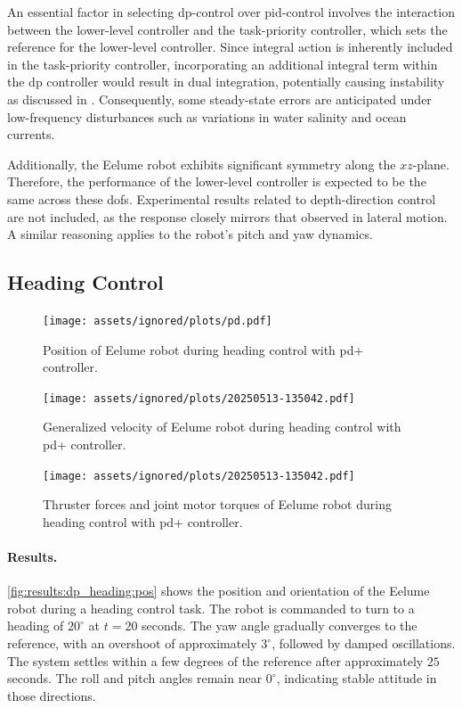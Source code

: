 An essential factor in selecting \gls{dp}-control over \gls{pid}-control involves the interaction between the lower-level controller and the task-priority controller, which sets the reference for the lower-level controller. Since integral action is inherently included in the task-priority controller, incorporating an additional integral term within the \gls{dp} controller would result in dual integration, potentially causing instability as discussed in \cite{fossen}. Consequently, some steady-state errors are anticipated under low-frequency disturbances such as variations in water salinity and ocean currents.

Additionally, the Eelume robot exhibits significant symmetry along the $xz$-plane. Therefore, the performance of the lower-level controller is expected to be the same across these \glspl{dof}. Experimental results related to depth-direction control are not included, as the response closely mirrors that observed in lateral motion. A similar reasoning applies to the robot’s pitch and yaw dynamics.

\subsection{Heading Control}

\begin{figure}[!ht]
    \centering
    \texttt{[image: assets/ignored/plots/pd.pdf]}
    \caption{Position of Eelume robot during heading control with \gls{pd+} controller.}
    \label{fig:results:dp_heading:pos}
\end{figure}
\begin{figure}[!ht]
    \centering
    \texttt{[image: assets/ignored/plots/20250513-135042.pdf]}
    \caption{Generalized velocity of Eelume robot during heading control with \gls{pd+} controller.}
    \label{fig:results:dp_heading:vel}
\end{figure}
\begin{figure}[!ht]
    \centering
    \texttt{[image: assets/ignored/plots/20250513-135042.pdf]}
    \caption{Thruster forces and joint motor torques of Eelume robot during heading control with \gls{pd+} controller.}
    \label{fig:results:dp_heading:forces2}
\end{figure}

\paragraph{Results.}
\autoref{fig:results:dp_heading:pos} shows the position and orientation of the 
Eelume robot during a heading control task. The robot is commanded to turn to 
a heading of \(20^\circ\) at \(t = 20\) seconds. The yaw angle gradually 
converges to the reference, with an overshoot of approximately \(3^\circ\), 
followed by damped oscillations. The system settles within a few degrees of 
the reference after approximately \(25\) seconds. The roll and pitch angles 
remain near \(0^\circ\), indicating stable attitude in those directions.

